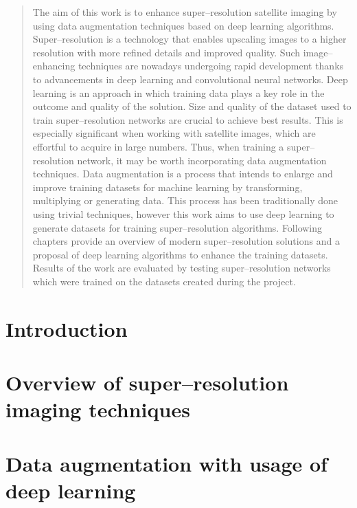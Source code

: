 \documentclass{report}
\begin{document}

\begin{abstract}
The aim of this work is to enhance super--resolution satellite imaging by using
data augmentation techniques based on deep learning algorithms.
Super--resolution is a technology that enables upscaling images to a higher
resolution with more refined details and improved quality.
Such image--enhancing techniques are nowadays undergoing rapid development
thanks to advancements in deep learning and convolutional neural networks.
Deep learning is an approach in which training data plays a key role in the
outcome and quality of the solution.
Size and quality of the dataset used to train super--resolution networks are
crucial to achieve best results.
This is especially significant when working with satellite images, which are
effortful to acquire in large numbers.
Thus, when training a super--resolution network, it may be worth incorporating
data augmentation techniques.
Data augmentation is a process that intends to enlarge and improve training
datasets for machine learning by transforming, multiplying or generating data.
This process has been traditionally done using trivial techniques, however this
work aims to use deep learning to generate datasets for training
super--resolution algorithms.
Following chapters provide an overview of modern super--resolution solutions
and a proposal of deep learning algorithms to enhance the training datasets.
Results of the work are evaluated by testing super--resolution networks which
were trained on the datasets created during the project.
\end{abstract}

\tableofcontents


\chapter{Introduction}


\chapter{Overview of super--resolution imaging techniques}


\chapter{Data augmentation with usage of deep learning}

\end{document}
